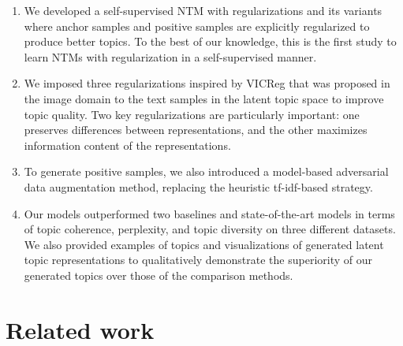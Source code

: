 \documentclass{article}
\begin{document}
\begin{enumerate}
    \item We developed a self-supervised NTM with regularizations and its variants where anchor samples and positive samples are explicitly regularized to produce better topics. To the best of our knowledge, this is the first study to learn NTMs with regularization in a self-supervised manner.
    \item We imposed three regularizations inspired by VICReg that was proposed in the image domain to the text samples in the latent topic space to improve topic quality. Two key regularizations are particularly important: one preserves differences between representations, and the other maximizes information content of the representations.
    \item To generate positive samples, we also introduced a model-based adversarial data augmentation method, replacing the heuristic tf-idf-based strategy.
    \item Our models outperformed two baselines and state-of-the-art models in terms of topic coherence, perplexity, and topic diversity on three different datasets. We also provided examples of topics and visualizations of generated latent topic representations to qualitatively demonstrate the superiority of our generated topics over those of the comparison methods.
\end{enumerate}

\section{Related work}\label{sec2}
\end{document}
